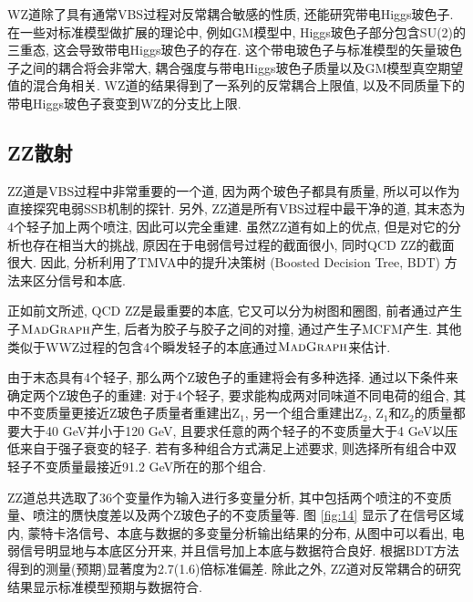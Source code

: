 \documentclass{SCIS2020cn}
\newcommand{\MADGRAPH}{\textsc{MadGraph}\xspace}
\newcommand{\Zboson}{\text{Z}}
\begin{document}
WZ道除了具有通常VBS过程对反常耦合敏感的性质, 还能研究带电Higgs玻色子. 在一些对标准模型做扩展的理论中, 例如GM模型中, Higgs玻色子部分包含SU(2)的三重态, 这会导致带电Higgs玻色子的存在. 这个带电玻色子与标准模型的矢量玻色子之间的耦合将会非常大, 耦合强度与带电Higgs玻色子质量以及GM模型真空期望值的混合角相关. WZ道的结果得到了一系列的反常耦合上限值, 以及不同质量下的带电Higgs玻色子衰变到WZ的分支比上限. 

\subsection{ZZ散射}

ZZ道是VBS过程中非常重要的一个道, 因为两个玻色子都具有质量, 所以可以作为直接探究电弱SSB机制的探针. 另外, ZZ道是所有VBS过程中最干净的道, 其末态为4个轻子加上两个喷注, 因此可以完全重建. 虽然ZZ道有如上的优点, 但是对它的分析也存在相当大的挑战, 原因在于电弱信号过程的截面很小, 同时QCD ZZ的截面很大. 因此, 分析利用了TMVA中的提升决策树 (Boosted Decision Tree, BDT) 方法来区分信号和本底. 

正如前文所述, QCD ZZ是最重要的本底, 它又可以分为树图和圈图, 前者通过产生子$\MADGRAPH$产生, 后者为胶子与胶子之间的对撞, 通过产生子MCFM产生. 其他类似于WWZ过程的包含4个瞬发轻子的本底通过$\MADGRAPH$来估计. 

由于末态具有4个轻子, 那么两个Z玻色子的重建将会有多种选择. 通过以下条件来确定两个Z玻色子的重建: 对于4个轻子, 要求能构成两对同味道不同电荷的组合, 其中不变质量更接近Z玻色子质量者重建出$\Zboson_1$, 另一个组合重建出$\Zboson_2$, $\Zboson_1$和$\Zboson_2$的质量都要大于40 GeV并小于120 GeV, 且要求任意的两个轻子的不变质量大于4 GeV以压低来自于强子衰变的轻子. 若有多种组合方式满足上述要求, 则选择所有组合中双轻子不变质量最接近91.2 GeV所在的那个组合. 

ZZ道总共选取了36个变量作为输入进行多变量分析, 其中包括两个喷注的不变质量、喷注的赝快度差以及两个Z玻色子的不变质量等. 图 \ref{fig:14} 显示了在信号区域内, 蒙特卡洛信号、本底与数据的多变量分析输出结果的分布, 从图中可以看出, 电弱信号明显地与本底区分开来, 并且信号加上本底与数据符合良好. 根据BDT方法得到的测量(预期)显著度为2.7(1.6)倍标准偏差. 除此之外, ZZ道对反常耦合的研究结果显示标准模型预期与数据符合. 
\end{document}
